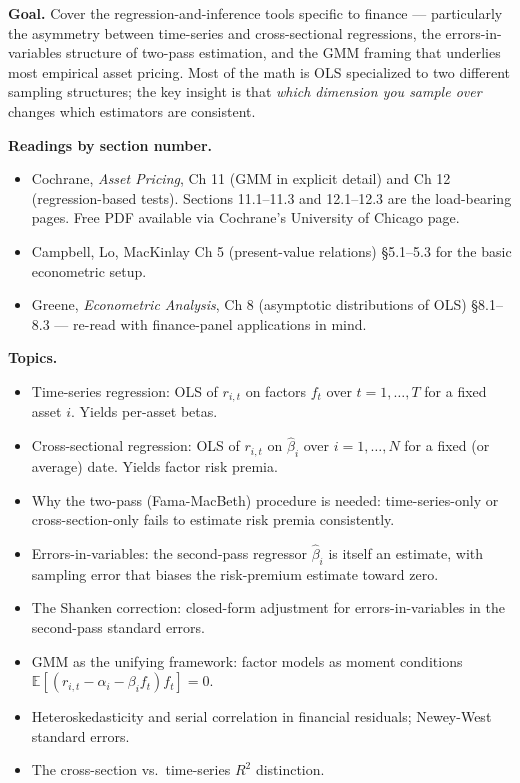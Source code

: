 \textbf{Goal.} Cover the regression-and-inference tools specific to
finance --- particularly the asymmetry between time-series and
cross-sectional regressions, the errors-in-variables structure of
two-pass estimation, and the GMM framing that underlies most empirical
asset pricing. Most of the math is OLS specialized to two different
sampling structures; the key insight is that \emph{which dimension you
sample over} changes which estimators are consistent.

\textbf{Readings by section number.}

\begin{itemize}
\tightlist
\item
  Cochrane, \emph{Asset Pricing}, Ch 11 (GMM in explicit detail) and Ch
  12 (regression-based tests). Sections 11.1--11.3 and 12.1--12.3 are
  the load-bearing pages. Free PDF available via Cochrane's University
  of Chicago page.
\item
  Campbell, Lo, MacKinlay Ch 5 (present-value relations) §5.1--5.3 for
  the basic econometric setup.
\item
  Greene, \emph{Econometric Analysis}, Ch 8 (asymptotic distributions of
  OLS) §8.1--8.3 --- re-read with finance-panel applications in mind.
\end{itemize}

\textbf{Topics.}

\begin{itemize}
\tightlist
\item
  Time-series regression: OLS of \(r_{i,t}\) on factors \(f_t\) over
  \(t = 1, \ldots, T\) for a fixed asset \(i\). Yields per-asset betas.
\item
  Cross-sectional regression: OLS of \(r_{i,t}\) on \(\hat{\beta}_i\)
  over \(i = 1, \ldots, N\) for a fixed (or average) date. Yields factor
  risk premia.
\item
  Why the two-pass (Fama-MacBeth) procedure is needed: time-series-only
  or cross-section-only fails to estimate risk premia consistently.
\item
  Errors-in-variables: the second-pass regressor \(\hat{\beta}_i\) is
  itself an estimate, with sampling error that biases the risk-premium
  estimate toward zero.
\item
  The Shanken correction: closed-form adjustment for errors-in-variables
  in the second-pass standard errors.
\item
  GMM as the unifying framework: factor models as moment conditions
  \(\mathbb{E}[(r_{i,t} - \alpha_i - \beta_i f_t) f_t] = 0\).
\item
  Heteroskedasticity and serial correlation in financial residuals;
  Newey-West standard errors.
\item
  The cross-section vs.~time-series \(R^2\) distinction.
\end{itemize}

